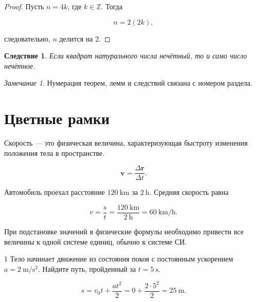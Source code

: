 \documentclass[12pt,a4paper]{article}
\newtheorem{corollary}[theorem]{Следствие}
\theoremstyle{definition}
\theoremstyle{remark}
\newtheorem{remark}[theorem]{Замечание}
\newcommand{\Z}{\mathbb{Z}}
\newcommand{\vect}[1]{\bm{#1}}
\begin{document}
\begin{proof}
Пусть $n=4k$, где $k\in\Z$. Тогда

\[
    n=2(2k),
\]

следовательно, $n$ делится на $2$.
\end{proof}

\begin{corollary}
Если квадрат натурального числа нечётный, то и само число нечётное.
\end{corollary}

\begin{remark}
Нумерация теорем, лемм и следствий связана с номером раздела.
\end{remark}


\section{Цветные рамки}

\begin{definitionbox}
Скорость --- это физическая величина, характеризующая быстроту изменения
положения тела в пространстве.

\[
    \vect{v}
    =
    \frac{\Delta\vect{r}}{\Delta t}.
\]
\end{definitionbox}

\begin{examplebox}
Автомобиль проехал расстояние $\SI{120}{\kilo\meter}$ за
$\SI{2}{\hour}$. Средняя скорость равна

\[
    v
    =
    \frac{s}{t}
    =
    \frac{\SI{120}{\kilo\meter}}{\SI{2}{\hour}}
    =
    \SI{60}{\kilo\meter\per\hour}.
\]
\end{examplebox}

\begin{warningbox}
При подстановке значений в физические формулы необходимо привести все
величины к одной системе единиц, обычно к системе СИ.
\end{warningbox}

\begin{taskbox}{1}
Тело начинает движение из состояния покоя с постоянным ускорением
$a=\SI{2}{\meter\per\second\squared}$. Найдите путь, пройденный за
$t=\SI{5}{\second}$.

\[
    s
    =
    v_0t+\frac{at^2}{2}
    =
    0+\frac{2\cdot5^2}{2}
    =
    \SI{25}{\meter}.
\]
\end{taskbox}
\end{document}
